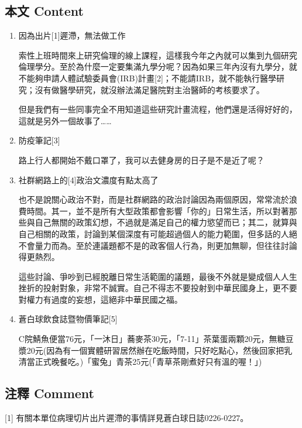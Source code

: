 \documentclass[a5paper, 11pt
]{book}
\begin{document}
\hypertarget{ux672cux6587-content-75}{%
\subsection{本文 Content}\label{ux672cux6587-content-75}}

\begin{enumerate}
\def\labelenumi{\arabic{enumi}.}
\item
  因為出片{[}1{]}遲滯，無法做工作

  索性上班時間來上研究倫理的線上課程，這樣我今年之內就可以集到九個研究倫理學分。至於為什麼一定要集滿九學分呢？因為如果三年內沒有九學分，就不能夠申請人體試驗委員會(IRB)計畫{[}2{]}；不能請IRB，就不能執行醫學研究；沒有做醫學研究，就沒辦法滿足醫院對主治醫師的考核要求了。

  但是我們有一些同事完全不用知道這些研究計畫流程，他們還是活得好好的，這就是另外一個故事了\ldots\ldots{}
\item
  防疫筆記{[}3{]}

  路上行人都開始不戴口罩了，我可以去健身房的日子是不是近了呢？
\item
  社群網路上的{[}4{]}政治文濃度有點太高了

  也不是說關心政治不對，而是社群網路的政治討論因為兩個原因，常常流於浪費時間。其一，並不是所有大型政策都會影響「你的」日常生活，所以對著那些與自己無關的政策幻想，不過就是滿足自己的權力慾望而已；其二，就算與自己相關的政策，討論到某個深度有可能超過個人的能力範圍，但多話的人絕不會量力而為。至於連議題都不是的政客個人行為，則更加無聊，但往往討論得更熱烈。

  這些討論、爭吵到已經脫離日常生活範圍的議題，最後不外就是變成個人人生挫折的投射對象，非常不誠實。自己不得志不要投射到中華民國身上，更不要對權力有過度的妄想，這絕非中華民國之福。
\item
  蒼白球飲食誌暨物價筆記{[}5{]}

  C院鯖魚便當76元，「一沐日」蕎麥茶30元，「7-11」茶葉蛋兩顆20元，無糖豆漿20元(因為有一個實體研習居然辦在吃飯時間，只好吃點心，然後回家把乳清當正式晚餐吃。)「蜜兔」青茶25元(「青草茶剛煮好只有溫的喔！」)
\end{enumerate}

\hypertarget{ux6ce8ux91cb-comment-75}{%
\subsection{注釋 Comment}\label{ux6ce8ux91cb-comment-75}}

{[}1{]} 有關本單位病理切片出片遲滯的事情詳見蒼白球日誌0226-0227。
\end{document}
